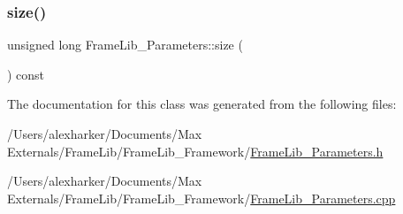 \mbox{\label{class_frame_lib___parameters_a391d0cb37c904981f7ad52bc0ba1b111}} 
\subsubsection{\texorpdfstring{size()}{size()}}
{\footnotesize\ttfamily unsigned long Frame\+Lib\+\_\+\+Parameters\+::size (\begin{DoxyParamCaption}{ }\end{DoxyParamCaption}) const\hspace{0.3cm}{\ttfamily [inline]}}



The documentation for this class was generated from the following files\+:\begin{DoxyCompactItemize}
\item 
/\+Users/alexharker/\+Documents/\+Max Externals/\+Frame\+Lib/\+Frame\+Lib\+\_\+\+Framework/\hyperlink{_frame_lib___parameters_8h}{Frame\+Lib\+\_\+\+Parameters.\+h}\item 
/\+Users/alexharker/\+Documents/\+Max Externals/\+Frame\+Lib/\+Frame\+Lib\+\_\+\+Framework/\hyperlink{_frame_lib___parameters_8cpp}{Frame\+Lib\+\_\+\+Parameters.\+cpp}\end{DoxyCompactItemize}
